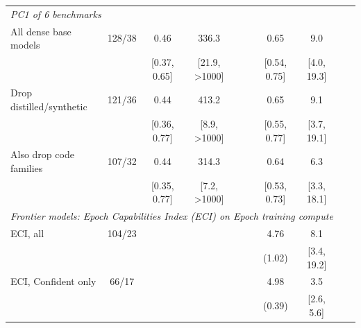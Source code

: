 \begin{table}[!htbp]
\begin{threeparttable}
\begin{tabular}{lccccccccc}
\multicolumn{10}{l}{\textit{PC1 of 6 benchmarks}} \\
All dense base models & 128/38 & 0.46 & 336.3 &  &  & 0.65 & 9.0 &  &  \\
 &  & [0.37, 0.65] & [21.9, >1000] &  &  & [0.54, 0.75] & [4.0, 19.3] &  &  \\
Drop distilled/synthetic & 121/36 & 0.44 & 413.2 &  &  & 0.65 & 9.1 &  &  \\
 &  & [0.36, 0.77] & [8.9, >1000] &  &  & [0.55, 0.77] & [3.7, 19.1] &  &  \\
Also drop code families & 107/32 & 0.44 & 314.3 &  &  & 0.64 & 6.3 &  &  \\
 &  & [0.35, 0.77] & [7.2, >1000] &  &  & [0.53, 0.73] & [3.3, 18.1] &  &  \\
\midrule
\multicolumn{10}{l}{\textit{Frontier models: Epoch Capabilities Index (ECI) on Epoch training compute}} \\
ECI, all & 104/23 &  &  &  &  & 4.76 & 8.1 &  &  \\
 &  &  &  &  &  & (1.02) & [3.4, 19.2] &  &  \\
ECI, Confident only & 66/17 &  &  &  &  & 4.98 & 3.5 &  &  \\
 &  &  &  &  &  & (0.39) & [2.6, 5.6] &  &  \\
\bottomrule
\end{tabular}
\begin{tablenotes}[flushleft]
\footnotesize

\end{tablenotes}
\end{threeparttable}
\end{table}
